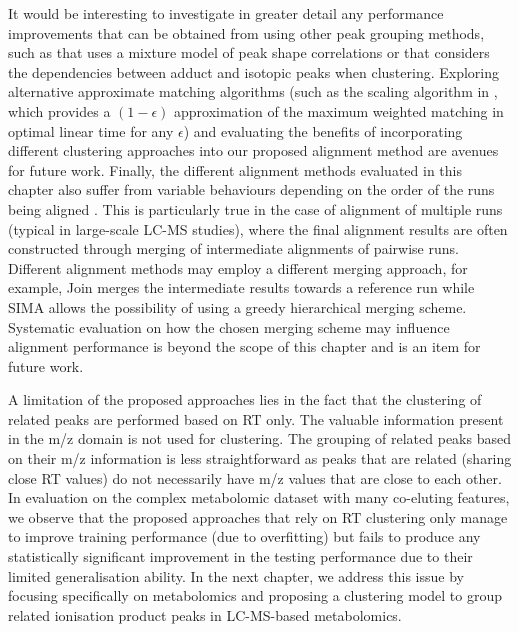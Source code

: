 It would be interesting to investigate in greater detail any performance improvements that can be obtained from using other peak grouping methods, such as \cite{Rogers2012} that uses a mixture model of peak shape correlations or \cite{Daly2014} that considers the dependencies between adduct and isotopic peaks when clustering. Exploring alternative approximate matching algorithms (such as the scaling algorithm in \cite{Maximum2011}, which provides a $(1-\epsilon)$ approximation of the maximum weighted matching in optimal linear time for any $\epsilon$) and evaluating the benefits of incorporating different clustering approaches into our proposed alignment method are avenues for future work. Finally, the different alignment methods evaluated in this chapter also suffer from variable behaviours depending on the order of the runs being aligned \cite{Smith2014}. This is particularly true in the case of alignment of multiple runs (typical in large-scale LC-MS studies), where the final alignment results are often constructed through merging of intermediate alignments of pairwise runs. Different alignment methods may employ a different merging approach, for example, Join merges the intermediate results towards a reference run while SIMA allows the possibility of using a greedy hierarchical merging scheme. Systematic evaluation on how the chosen merging scheme may influence alignment performance is beyond the scope of this chapter and is an item for future work.

A limitation of the proposed approaches lies in the fact that the clustering of related peaks are performed based on RT only. The valuable information present in the m/z domain is not used for clustering. The grouping of related peaks based on their m/z information is less straightforward as peaks that are related (sharing close RT values) do not necessarily have m/z values that are close to each other. In evaluation on the complex metabolomic dataset with many co-eluting features, we observe that the proposed approaches that rely on RT clustering only manage to improve training performance (due to overfitting) but fails to produce any statistically significant improvement in the testing performance due to their limited generalisation ability. In the next chapter, we address this issue by focusing specifically on metabolomics and proposing a clustering model to group related ionisation product peaks in LC-MS-based metabolomics. 